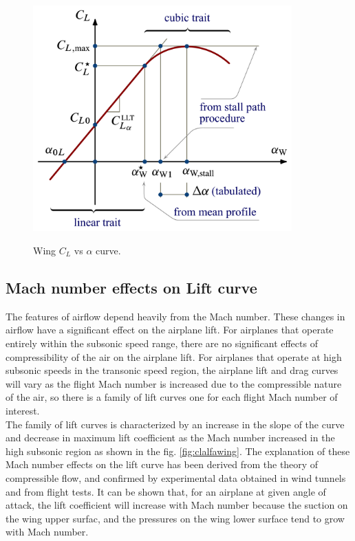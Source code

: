 \begin{figure}[H]
\centering
{\includegraphics[height=8.69cm]{Immagini/Wing_CL_Vs_alpha_curve.pdf}} 
\caption{Wing $C_L$ vs $\alpha$ curve.}
\label{fig:clalfa}
\end{figure}



\subsection{Mach number effects on Lift curve }
The features of airflow depend heavily from the Mach number. These changes in airflow have a significant effect on the airplane lift. For airplanes that operate entirely within the subsonic speed range, there are no significant effects of compressibility of the air on the airplane lift. For airplanes that operate at high subsonic speeds in the transonic speed region, the airplane lift and drag curves will vary as the flight Mach number is increased due to the compressible nature of the air, so there is a family of lift curves one for each flight Mach number of interest.\\
The family of lift curves is characterized by an increase in the slope of the curve and decrease in maximum lift coefficient as the Mach number increased in the high subsonic region as shown in the fig. \ref{fig:clalfawing}.
The explanation of these Mach number effects on the lift curve has been derived from the theory of compressible flow, and confirmed by experimental data obtained in wind tunnels and from flight tests. It can be shown that, for an airplane at given angle of attack, the lift coefficient will increase with Mach number because the suction on the wing upper surfac, and the pressures on the wing lower surface tend to grow with Mach number.  \cite{manual}

